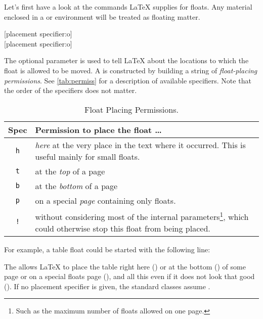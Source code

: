 Let's first have a look at the commands \LaTeX{} supplies
for floats.
Any material enclosed in a  or  environment will
be treated as floating matter.
\begin{lscommand}
  [placement specifier:o] \\
  [placement specifier:o]
\end{lscommand}
The optional  parameter is used to tell \LaTeX{}
about the locations to which the float is allowed to be moved.  A
 is constructed by building a string of
\emph{float-placing permissions}. See \autoref{tab:permiss} for a description
of available specifiers. Note that the order of the specifiers does not matter.

\begin{table}
  \begin{minipage}{\textwidth}
    \centering
    \caption{Float Placing Permissions.}\label{tab:permiss}
    \begin{tabular}{@{}cp{8cm}@{}}
      \toprule
      Spec       & Permission to place the float \ldots             \\
      \midrule
      \texttt{h} & \emph{here} at the very place in the text
      where it occurred.  This is useful mainly for small floats.   \\
      \texttt{t} & at the \emph{top} of a page                      \\
      \texttt{b} & at the \emph{bottom} of a page                   \\
      \texttt{p} & on a special \emph{page} containing only floats. \\
      \texttt{!} & without considering most of the
      internal parameters\footnote{Such as the
        maximum number of floats allowed  on one page.},
      which could otherwise stop this
      float from being placed.                                      \\
      \bottomrule
    \end{tabular}
  \end{minipage}
\end{table}

For example, a table float could be started with the following line:
\begin{code}
\texttt|\begin{table}[!hbp]|
\end{code}
The  \cargv{[!hbp]} allows \LaTeX{} to
place the table right here () or at the bottom ()
of some page
or on a special floats page (), and all this even if it does not
look that good (\cargv{!}). If no placement specifier is given, the standard
classes assume \cargv{[tbp]}.

